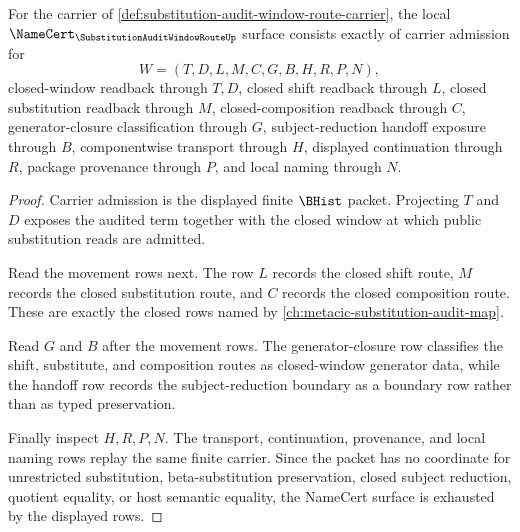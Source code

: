 \begin{theorem}
\label{thm:substitution-audit-window-route-namecert-obligations}
For the carrier of \autoref{def:substitution-audit-window-route-carrier}, the local $\NameCert_{\SubstitutionAuditWindowRouteUp}$ surface consists exactly of carrier admission for
$$
W=(T,D,L,M,C,G,B,H,R,P,N),
$$
closed-window readback through $T,D$, closed shift readback through $L$, closed substitution readback through $M$, closed-composition readback through $C$, generator-closure classification through $G$, subject-reduction handoff exposure through $B$, componentwise transport through $H$, displayed continuation through $R$, package provenance through $P$, and local naming through $N$.
\end{theorem}
\begin{proof}
Carrier admission is the displayed finite $\BHist$ packet. Projecting $T$ and $D$ exposes the audited term together with the closed window at which public substitution reads are admitted.

Read the movement rows next. The row $L$ records the closed shift route, $M$ records the closed substitution route, and $C$ records the closed composition route. These are exactly the closed rows named by \autoref{ch:metacic-substitution-audit-map}.

Read $G$ and $B$ after the movement rows. The generator-closure row classifies the shift, substitute, and composition routes as closed-window generator data, while the handoff row records the subject-reduction boundary as a boundary row rather than as typed preservation.

Finally inspect $H,R,P,N$. The transport, continuation, provenance, and local naming rows replay the same finite carrier. Since the packet has no coordinate for unrestricted substitution, beta-substitution preservation, closed subject reduction, quotient equality, or host semantic equality, the NameCert surface is exhausted by the displayed rows.
\end{proof}

